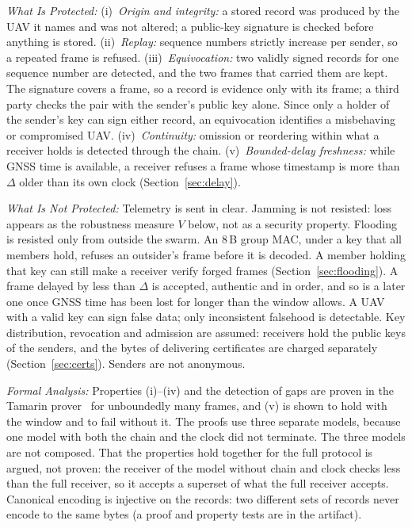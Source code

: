 \documentclass[lineno,pdflatex,sn-mathphys-num]{sn-jnl}
\newcommand{\runin}[1]{\textit{#1:}}
\renewcommand{\_}{\authbcunderscore\allowbreak}
\begin{document}
\runin{What Is Protected} (i)~\emph{Origin and integrity:} a stored record was produced by the
UAV it names and was not altered; a public-key signature is checked before anything is stored.
(ii)~\emph{Replay:} sequence numbers strictly increase per sender, so a repeated frame is
refused. (iii)~\emph{Equivocation:} two validly signed records for one sequence number are
detected, and the two frames that carried them are kept. The signature covers a frame, so a
record is evidence only with its frame; a third party checks the pair with the sender's public
key alone. Since only a holder of the sender's key can sign either record, an equivocation
identifies a misbehaving or compromised UAV. (iv)~\emph{Continuity:} omission or reordering
within what a receiver holds is detected through the chain. (v)~\emph{Bounded-delay freshness:}
while GNSS time is available, a receiver refuses a frame whose timestamp is more than $\Delta$
older than its own clock (Section~\ref{sec:delay}).

\runin{What Is Not Protected} Telemetry is sent in clear. Jamming is not resisted: loss appears
as the robustness measure $V$ below, not as a security property. Flooding is resisted only from
outside the swarm. An 8\,B group MAC, under a key that all members hold, refuses an outsider's
frame before it is decoded. A member holding that key can still make a receiver verify forged
frames (Section~\ref{sec:flooding}). A frame delayed by less than $\Delta$ is accepted, authentic
and in order, and so is a later one once GNSS time has been lost for longer than the window
allows. A UAV with a valid key can sign false data; only inconsistent falsehood is detectable.
Key distribution, revocation and admission are assumed: receivers hold the public keys of the
senders, and the bytes of delivering certificates are charged separately
(Section~\ref{sec:certs}). Senders are not anonymous.

\runin{Formal Analysis} Properties (i)--(iv) and the detection of gaps are proven in the Tamarin
prover~\cite{tamarin} for unboundedly many frames, and (v) is shown to hold with the window and
to fail without it. The proofs use three separate models, because one model with both the chain
and the clock did not terminate. The three models are not composed. That the properties hold
together for the full protocol is argued, not proven: the receiver of the model without chain
and clock checks less than the full receiver, so it accepts a superset of what the full receiver
accepts. Canonical encoding is injective on the records: two different sets of records never
encode to the same bytes (a proof and property tests are in the artifact).
\end{document}
